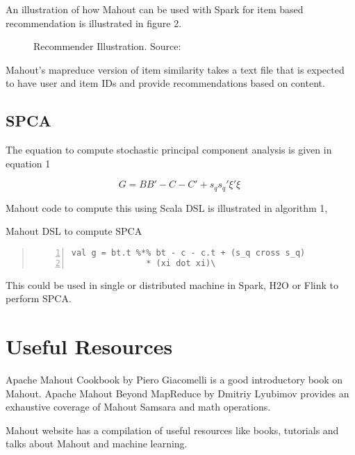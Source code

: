\documentclass[9pt,twocolumn,twoside]{../../styles/osajnl}
\begin{document}
An illustration of how Mahout can be used with Spark for item based
recommendation is illustrated in figure 2.

\begin{figure}[htbp]
\centering
{}
\caption{Recommender Illustration. \newline Source: \cite{www-recommendations}}
\label{fig:false-color}
\end{figure}

Mahout's mapreduce version of item similarity takes a text file that is
expected to have user and item IDs and provide recommendations based
on content.

\subsection{SPCA}
The equation to compute stochastic principal component analysis is
given in equation 1

\begin{equation}
G=B{B}' - C - {C}' + s_{q} {s_{q}}' {\xi}' \xi\
\label{equation1}
\end{equation}


Mahout code to compute this using Scala DSL is illustrated in
algorithm 1,

\begin{algorithm}
\caption{Mahout DSL to compute SPCA}\label{alg:mahout}
\begin{quote}
\begin{Verbatim}[numbers=left]
val g = bt.t %*% bt - c - c.t + (s_q cross s_q) 
               * (xi dot xi)\
\end{Verbatim}
\end{quote}
\end{algorithm}



This could be used in single or distributed machine in Spark, H2O or
Flink to perform SPCA.

\section{Useful Resources}
Apache Mahout Cookbook\cite{book-mahout} by Piero Giacomelli is a good
introductory book on Mahout. Apache Mahout\: Beyond
MapReduce\cite{book-samsara} by Dmitriy Lyubimov provides an
exhaustive coverage of Mahout Samsara and math operations.

Mahout website\cite{www-mahoutResources} has a compilation of
useful resources like books, tutorials and talks about Mahout and
machine learning.
\end{document}

